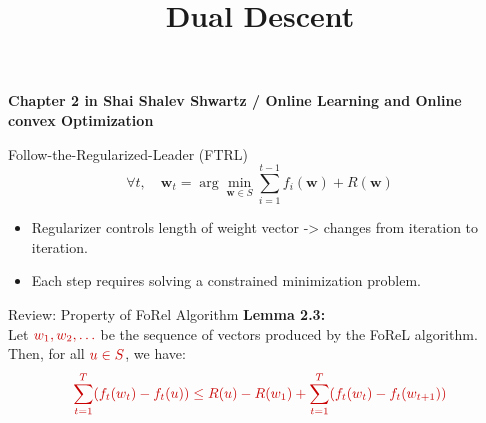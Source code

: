 \documentclass{beamer}
\title{Dual Descent}
\newcommand{\mathred}[1]{\textcolor{mathred}{#1}}
\begin{document}
\begin{small}

\begin{frame}
  \titlepage
{\bf Chapter 2 in Shai Shalev Shwartz / Online Learning and Online convex Optimization} 
\end{frame}

\begin{frame}{Follow-the-Regularized-Leader (FTRL)}
        \begin{equation*}
            \forall t, \quad \mathbf{w}_t = \arg\min_{\mathbf{w} \in S} \sum_{i=1}^{t-1} f_i(\mathbf{w}) + R(\mathbf{w})
        \end{equation*}
\begin{itemize}
  \item Regularizer controls length of weight vector -> changes from iteration to iteration.
  \item Each step requires solving a constrained minimization problem.
    \end{itemize}
\end{frame}

\begin{frame}{Review: Property of FoRel Algorithm}
\textbf{Lemma 2.3:}\\
Let $\mathred{w_1, w_2, \dots}$ be the sequence of vectors produced by the FoReL algorithm. Then, for all $\mathred{u \in S}$, we have:
\begin{equation*}
\mathred{\sum_{t=1}^{T} (f_t(w_t) - f_t(u)) \leq R(u) - R(w_1) + \sum_{t=1}^{T} (f_t(w_t) - f_t(w_{t+1}))}
\end{equation*}
\end{frame}

\end{small}
\end{document}
